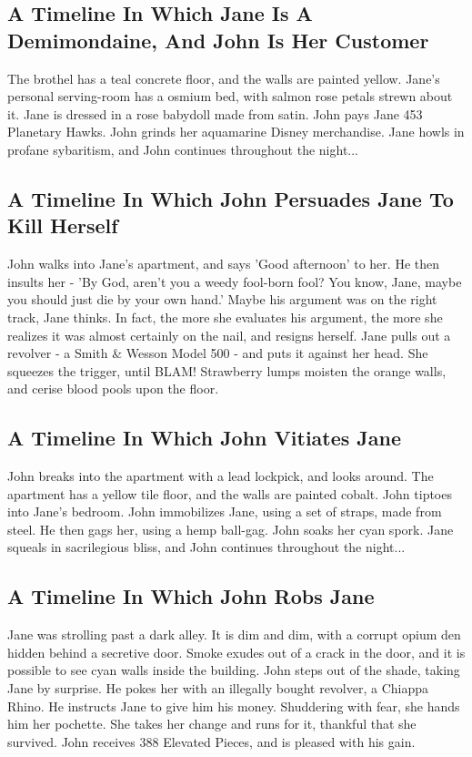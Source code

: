 \documentclass{article}
\begin{document}
\subsection{A Timeline In Which Jane Is A Demimondaine, And John Is Her Customer}


The brothel has a teal concrete floor, and the walls are painted yellow.
Jane's personal serving{-}room has a osmium bed, with salmon rose petals strewn about it.
Jane is dressed in a rose babydoll made from satin.
John pays Jane 453 Planetary Hawks.
John grinds her aquamarine Disney merchandise.
Jane howls in profane sybaritism, and John continues throughout the night...
\subsection{A Timeline In Which John Persuades Jane To Kill Herself}


John walks into Jane's apartment, and says 'Good afternoon' to her.
He then insults her {-} 'By God, aren't you a weedy fool{-}born fool?
You know, Jane, maybe you should just die by your own hand.'
Maybe his argument was on the right track, Jane thinks.
In fact, the more she evaluates his argument, the more she realizes it was almost certainly on the nail, and resigns herself.
Jane pulls out a revolver {-} a Smith \& Wesson Model 500 {-} and puts it against her head.
She squeezes the trigger, until BLAM!
Strawberry lumps moisten the orange walls, and cerise blood pools upon the floor.
\subsection{A Timeline In Which John Vitiates Jane}


John breaks into the apartment with a lead lockpick, and looks around.
The apartment has a yellow tile floor, and the walls are painted cobalt.
John tiptoes into Jane's bedroom.
John immobilizes Jane, using a set of straps, made from steel.
He then gags her, using a hemp ball{-}gag.
John soaks her cyan spork.
Jane squeals in sacrilegious bliss, and John continues throughout the night...
\subsection{A Timeline In Which John Robs Jane}


Jane was strolling past a dark alley.
It is dim and dim, with a corrupt opium den hidden behind a secretive door.
Smoke exudes out of a crack in the door, and it is possible to see cyan walls inside the building.
John steps out of the shade, taking Jane by surprise.
He pokes her with an illegally bought revolver, a Chiappa Rhino.
He instructs Jane to give him his money.
Shuddering with fear, she hands him her pochette.
She takes her change and runs for it, thankful that she survived.
John receives 388 Elevated Pieces, and is pleased with his gain.
\end{document}
